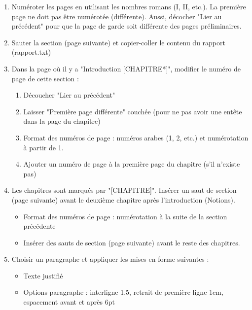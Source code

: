 \documentclass[11pt, a4paper]{article}
\begin{document}
\begin{enumerate}
	\item Numéroter les pages en utilisant les nombres romans (I, II, etc.). La première page ne doit pas être numérotée (différente). Aussi, décocher "Lier au précédent" pour que la page de garde soit différente des pages préliminaires.
	\item Sauter la section (page suivante) et copier-coller le contenu du rapport (rapport.txt)
	\item Dans la page où il y a "Introduction [CHAPITRE*]", modifier le numéro de page de cette section : 
	\begin{multicols}{2}
	\begin{enumerate}
		\item Découcher "Lier au précédent" 
		\item Laisser "Première page différente" couchée (pour ne pas avoir une entête dans la page du chapitre) 
		\item Format des numéros de page : numéros arabes (1, 2, etc.) et numérotation à partir de 1.
		\item Ajouter un numéro de page à la première page du chapitre (s'il n'existe pas)
	\end{enumerate}
	\end{multicols}
	
	\item Les chapitres sont marqués par "[CHAPITRE]". Insérer un saut de section (page suivante) avant le deuxième chapitre après l'introduction (Notions). 
	\begin{itemize}
		\item Format des numéros de page : numérotation à la suite de la section précédente
		\item Insérer des sauts de section (page suivante) avant le reste des chapitres. 
	\end{itemize}

	\item Choisir un paragraphe et appliquer les mises en forme suivantes : 
	\begin{itemize}
		\item Texte justifié 
		\item Options paragraphe : interligne 1.5, retrait de première ligne 1cm, espacement avant et après 6pt
	\end{itemize}


\end{enumerate}
\end{document}
